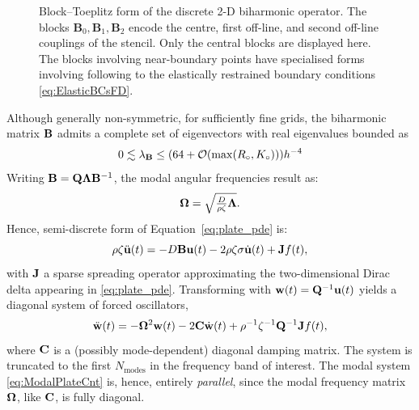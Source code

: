 \begin{figure}[t]
  \endgroup
  \caption[Block–Toeplitz form of the discrete 2-D biharmonic operator]{Block–Toeplitz form of the discrete 2-D biharmonic operator. The blocks
  \( {\mathbf B}_{0},{\mathbf B}_{1}, {\mathbf B}_{2} \) encode the centre, first off-line, and second off-line couplings of the stencil. Only the central blocks are displayed here. The blocks involving near-boundary points have specialised forms involving following to the elastically restrained boundary conditions \eqref{eq:ElasticBCsFD}. }
  \label{fig:biharmonic-matrix}
\end{figure}



Although generally non-symmetric, for sufficiently fine grids, the biharmonic matrix $\bf B$ admits a complete set of eigenvectors with real eigenvalues bounded as
\begin{equation}
0 \lesssim \lambda_{\bf B} \leq (64+ \mathcal{O}(\max(R_\circ,K_\circ))) h^{-4} 
\end{equation}
Writing ${\bf B} = {\bf Q} {\bf \Lambda} {\bf B}^{-1}$, the modal angular frequencies result as:
\begin{equation}
{\bf \Omega} = \sqrt{\tfrac{D}{\rho \zeta} {\bf \Lambda}}.
\end{equation}
Hence, semi-discrete form of Equation~\eqref{eq:plate_pde} is:
\begin{equation}
\rho \zeta \ddot{\bf u}(t) = -D {\bf B} {\bf u}(t) - 2\rho \zeta \sigma \dot{\bf u}(t) +  {\bf J} f(t),
\end{equation}
with $\bf J$ a sparse spreading operator approximating the two-dimensional Dirac delta appearing in \eqref{eq:plate_pde}. Transforming with ${\bf w}(t) = {\bf Q}^{-1}{\bf u}(t)$ yields a diagonal system of forced oscillators,
\begin{equation}\label{eq:ModalPlateCnt}
\ddot{\bf w}(t) = -{\bf \Omega}^2 {\bf w}(t) - 2{\bf C} \dot{\bf w}(t) + \rho^{-1}\zeta^{-1} {\bf Q}^{-1}{\bf J} f(t),
\end{equation}
where $\bf C$ is a (possibly mode-dependent) diagonal damping matrix. The system is truncated to the first $N_{\text{modes}}$ in the frequency band of interest. The modal system \eqref{eq:ModalPlateCnt} is, hence, entirely \emph{parallel}, since the modal frequency matrix $\bf \Omega$, like $\bf C$, is fully diagonal.



